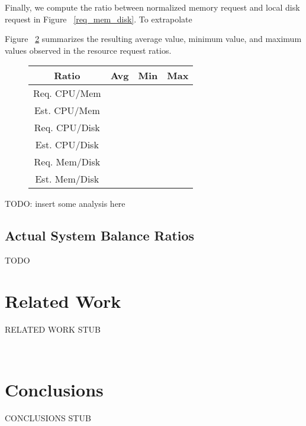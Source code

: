 \documentclass{sig-alternate}
\begin{document}
Finally, we compute the ratio between normalized memory request and local disk request in Figure ~\ref{req_mem_disk}.
To extrapolate

Figure ~\ref{} summarizes the resulting average value, minimum value, and maximum values observed in the resource request ratios.

\begin{figure}
\begin{tabular}{| c | c | c | c |} \hline
Ratio & Avg & Min & Max \\ \hline
Req. CPU/Mem & & & \\ \hline
Est. CPU/Mem & & & \\ \hline
Req. CPU/Disk & & & \\ \hline
Est. CPU/Disk & & & \\ \hline
Req. Mem/Disk & & & \\ \hline
Est. Mem/Disk & & & \\ \hline
\end{tabular}
\end{figure}

TODO: insert some analysis here

\subsection{Actual System Balance Ratios}

TODO

\section{Related Work}

RELATED WORK STUB

~\cite{clusterdata:Di2013}

\section{Conclusions}

CONCLUSIONS STUB






\end{document}
